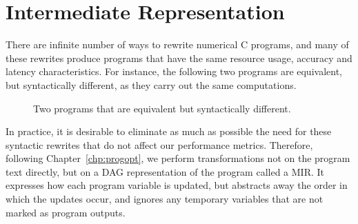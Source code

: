 \section{Intermediate Representation}
\label{lo:sec:intermediate}


There are infinite number of ways to rewrite numerical C programs, and many of
these rewrites produce programs that have the same resource usage, accuracy
and latency characteristics.  For instance, the following two programs
are equivalent, but syntactically different, as they carry out the same
computations.
\begin{figure}[ht]
    \centering
     \qquad \qquad
    \caption{Two programs that are equivalent but syntactically different.}
    \label{lo:fig:equiv_progs}
\end{figure}

In practice, it is desirable to eliminate as much as possible the need
for these syntactic rewrites that do not affect our performance metrics.
Therefore, following Chapter~\ref{chp:progopt}, we perform transformations not
on the program text directly, but on a DAG representation of the program called
a MIR\@.  It expresses how each program variable is updated, but abstracts away
the order in which the updates occur, and ignores any temporary variables that
are not marked as program outputs.

